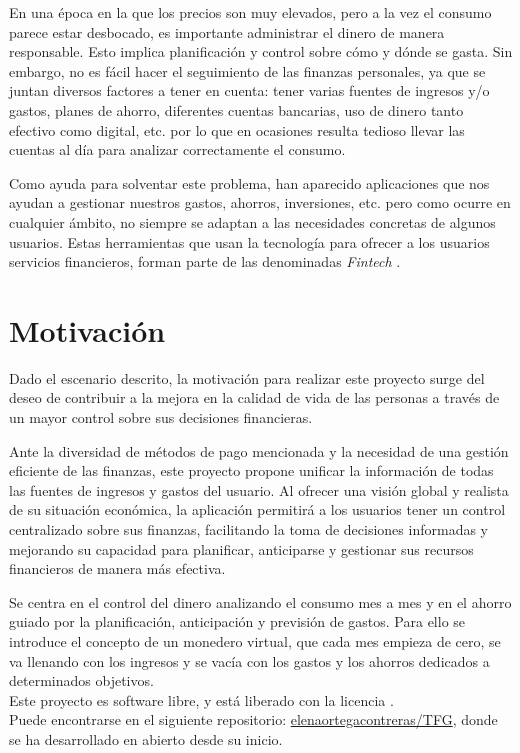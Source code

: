 En una época en la que los precios son muy elevados, pero a la vez el consumo parece estar desbocado, es importante administrar el dinero de manera responsable. Esto implica planificación y control sobre cómo y dónde se gasta. Sin embargo, no es fácil hacer el seguimiento de las finanzas personales, ya que se juntan diversos factores a tener en cuenta: tener varias fuentes de ingresos y/o gastos, planes de ahorro, diferentes cuentas bancarias, uso de dinero tanto efectivo como digital, etc. por lo que en ocasiones resulta tedioso llevar las cuentas al día para analizar correctamente el consumo.

Como ayuda para solventar este problema, han aparecido aplicaciones que nos ayudan a gestionar nuestros gastos, ahorros, inversiones, etc. pero como ocurre en cualquier ámbito, no siempre se adaptan a las necesidades concretas de algunos usuarios. Estas herramientas que usan la tecnología para ofrecer a los usuarios servicios financieros, forman parte de las denominadas \textit{Fintech} \cite{schueffel2016taming}.

\section{Motivación}
Dado el escenario descrito, la motivación para realizar este proyecto surge del deseo de contribuir a la mejora en la calidad de vida de las personas a través de un mayor control sobre sus decisiones financieras. 

Ante la diversidad de métodos de pago mencionada y la necesidad de una gestión eficiente de las finanzas, este proyecto propone unificar la información de todas las fuentes de ingresos y gastos del usuario. Al ofrecer una visión global y realista de su situación económica, la aplicación permitirá a los usuarios tener un control centralizado sobre sus finanzas, facilitando la toma de decisiones informadas y mejorando su capacidad para planificar, anticiparse y gestionar sus recursos financieros de manera más efectiva.

Se centra en el control del dinero analizando el consumo mes a mes y en el ahorro guiado por la planificación, anticipación y previsión de gastos. Para ello se introduce el concepto de un monedero virtual, que cada mes empieza de cero, se va llenando con los ingresos y se vacía con los gastos y los ahorros dedicados a determinados objetivos. \\

Este proyecto es software libre, y está liberado con la licencia \cite{gplv3}.\\
Puede encontrarse en el siguiente repositorio:
\href{https://github.com/elenaortegacontreras/TFG}{elenaortegacontreras/TFG}, 
donde se ha desarrollado en abierto desde su inicio.

